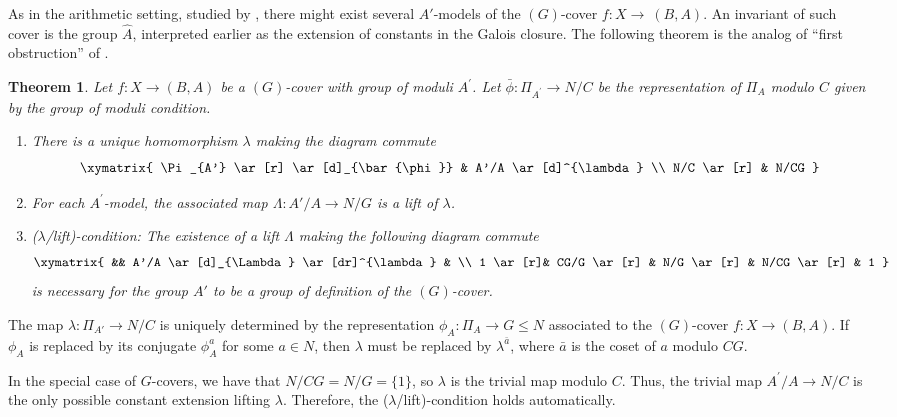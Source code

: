 \documentclass[10pt]{amsart}
\newtheorem{theorem}{Theorem}
\theoremstyle{definition}
\begin{document}
As in the arithmetic setting, studied by \cite{DebesDouai97}, there might exist several $A'$-models of the $(G)$-cover \linebreak $f\colon X \rightarrow~(B,A)$. An invariant of such cover is the group $\widehat{A}$, interpreted earlier as the extension of constants in the Galois closure. The following theorem is the analog of ``first obstruction'' of \cite[Main theorem I]{DebesDouai97}.   


\begin{theorem}{\label{thm:Mere1}}
Let $f\colon X\rightarrow (B,A)$ be a $(G)$-cover with group of moduli $A^\prime$. Let $\bar\phi \colon  \Pi_{A^\prime} \rightarrow N/C$ be the representation of $\Pi_A$ modulo $C$ given by the group of moduli condition.

  \begin{enumerate}
    \item
There is a unique homomorphism $\lambda$ making the  diagram commute
\[
  \xymatrix{
    \Pi_{A'} \ar[r] \ar[d]_{\bar{\phi}} & A'/A \ar[d]^{\lambda} \\ 
    N/C \ar[r] & N/CG
  }
\]
\item For each $A^\prime$-model, the associated map $\Lambda\colon A'/A \rightarrow N/G$ is a lift of $\lambda$. 
\item ($\lambda$/lift)-condition: The existence of a lift $\Lambda$ making the following diagram
commute
\[
  \xymatrix{
   && A'/A \ar[d]_{\Lambda} \ar [dr]^{\lambda} & \\
   1 \ar[r]& CG/G \ar[r] &  N/G \ar[r] & N/CG \ar[r] & 1
  }
\]
is necessary for the group $A'$ to be a group  of definition of the $(G)$-cover.  
  \end{enumerate}
\end{theorem}
The map $\lambda\colon \Pi_{A'} \rightarrow N/C$ is uniquely determined by the representation $\phi_{A} \colon \Pi_{A} \rightarrow G \leq N$ associated to the $(G)$-cover $f\colon X  \rightarrow (B,A)$. If $\phi_{A}$ is replaced by its conjugate $\phi_{A}^a$ for some $a\in N$, then $\lambda$ must be replaced by $\lambda^{\bar{a}}$, where $\bar{a}$ is the coset of $a$ modulo $CG$.  

In the special case of $G$-covers, we have that $N/CG=N/G=\{1\}$, so $\lambda$ is the trivial map modulo $C$. Thus, the trivial map $A^\prime/A \rightarrow N/C$ is the only possible constant extension lifting $\lambda$. Therefore, the ($\lambda$/lift)-condition holds automatically.    
\end{document}
